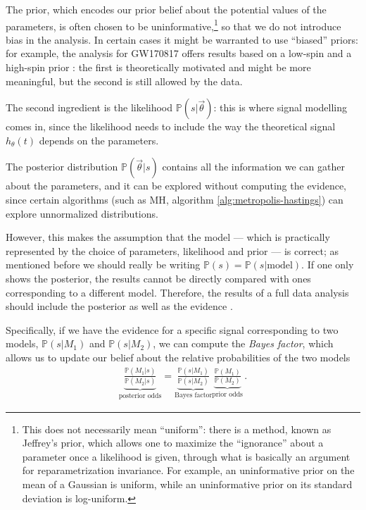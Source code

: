 \documentclass[main.tex]{subfiles}
\begin{document}

The prior, which encodes our prior belief about the potential values of the parameters, is often chosen to be uninformative,\footnote{This does not necessarily mean ``uniform'': there is a method, known as Jeffrey's prior, which allows one to maximize the ``ignorance'' about a parameter once a likelihood is given, through what is basically an argument for reparametrization invariance. For example, an uninformative prior on the mean of a Gaussian is uniform, while an uninformative prior on its standard deviation is log-uniform.} so that we do not introduce bias in the analysis. 
In certain cases it might be warranted to use ``biased'' priors: for example, the analysis for GW170817 offers results based on a low-spin and a high-spin prior \cite{abbottGW170817ObservationGravitational2017}: the first is theoretically motivated and might be more meaningful, but the second is still allowed by the data. 

The second ingredient is the likelihood \(\mathbb{P}(s | \vec{\theta})\): this is where signal modelling comes in, since the likelihood needs to include the way the theoretical signal \(h_\theta (t)\) depends on the parameters. 

The posterior distribution \(\mathbb{P}(\vec{\theta} | s)\) contains all the information we can gather about the parameters, and it can be explored without computing the evidence, since certain algorithms (such as \ac{MH}, algorithm \ref{alg:metropolis-hastings}) can explore unnormalized distributions. 

However, this makes the assumption that the model --- which is practically represented by the choice of parameters, likelihood and prior --- is correct; as mentioned before we should really be writing \( \mathbb{P}(s) = \mathbb{P}(s | \text{model})\). 
If one only shows the posterior, the results cannot be directly compared with ones corresponding to a different model. Therefore, the results of a full data analysis should include the posterior as well as the evidence \cites{skillingNestedSamplingGeneral2006}{knuthBayesianEvidenceModel2015}.

Specifically, if we have the evidence for a specific signal corresponding to two models, \(\mathbb{P}(s | M_1 )\) and \(\mathbb{P}(s | M_2 )\), we can compute the \emph{Bayes factor}, which allows us to update our belief about the relative probabilities of the two models 
%
\begin{align}
\underbrace{\frac{\mathbb{P}(M_1 | s)}{\mathbb{P}(M_2 | s)}}_{\text{posterior odds}} = \underbrace{\frac{\mathbb{P}(s | M_1 )}{\mathbb{P}(s | M_2 )}}_{\text{Bayes factor}} \underbrace{\frac{\mathbb{P}(M_1 )}{\mathbb{P}(M_2 )}}_{\text{prior odds}}
\,.
\end{align}
\end{document}
